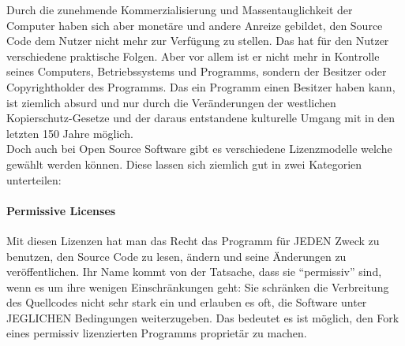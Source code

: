 \documentclass[a4paper,11pt]{article}
\begin{document}
Durch die zunehmende Kommerzialisierung und Massentauglichkeit der Computer haben sich aber monetäre und andere Anreize gebildet, den Source Code dem Nutzer nicht mehr zur Verfügung zu stellen. Das hat für den Nutzer verschiedene praktische Folgen. Aber vor allem ist er nicht mehr in Kontrolle seines Computers, Betriebssystems und Programms, sondern der Besitzer oder Copyrightholder des Programms. Das ein Programm einen Besitzer haben kann, ist ziemlich absurd und nur durch die Veränderungen der westlichen Kopierschutz-Gesetze und der daraus entstandene kulturelle Umgang mit  in den letzten 150 Jahre möglich.\\

Doch auch bei Open Source Software gibt es verschiedene Lizenzmodelle welche gewählt werden können. Diese lassen sich ziemlich gut in zwei Kategorien unterteilen:\\

\paragraph{Permissive Licenses}
Mit diesen Lizenzen hat man das Recht das Programm für JEDEN Zweck zu benutzen, den Source Code zu lesen, ändern und seine Änderungen zu veröffentlichen. Ihr Name kommt von der Tatsache, dass sie ``permissiv'' sind, wenn es um ihre wenigen Einschränkungen geht: Sie schränken die Verbreitung des Quellcodes nicht sehr stark ein und erlauben es oft, die Software unter JEGLICHEN Bedingungen weiterzugeben. Das bedeutet es ist möglich, den Fork eines permissiv lizenzierten Programms proprietär zu machen.\\
\end{document}
